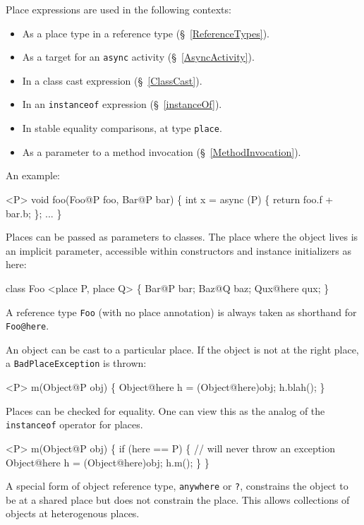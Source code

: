 Place expressions are used in the following contexts: 
\begin{itemize}
\item As a  place type in a reference type (\S~\ref{ReferenceTypes}).
\item As a target for an {\tt async} activity (\S~\ref{AsyncActivity}).
\item In a class cast expression  (\S~\ref{ClassCast}).
\item In an {\tt instanceof} expression (\S~\ref{instanceOf}).
\item In stable equality comparisons, at type {\tt place}.
\item As a parameter to a method invocation (\S~\ref{MethodInvocation}).
\end{itemize}

An example:
\begin{x10}
<P> void foo(Foo@P foo, Bar@P bar) \{
   int x = async (P) \{ return foo.f + bar.b; \};
   ...
\}
\end{x10}


Places can be passed as parameters to classes. The place where the
object lives is an implicit parameter, accessible within constructors
and instance initializers as here:

\begin{x10}
    class Foo <place P, place Q> \{
        Bar@P bar;
        Baz@Q baz;
        Qux@here qux;
    \}
\end{x10}

A reference type {\tt Foo} (with no place annotation) is always taken
as shorthand for {\tt Foo@here}.

An object can be cast to a particular place. If the object is not at
the right place, a {\tt BadPlaceException} is thrown:

\begin{x10}
    <P> m(Object@P obj) \{
        Object@here h = (Object@here)obj;
        h.blah();
    \}
\end{x10}

Places can be checked for equality. One can view this as the analog of
the {\tt instanceof} operator for places.

\begin{x10}
 <P> m(Object@P obj) \{
     if (here == P) \{
        // will never throw an exception
       Object@here h = (Object@here)obj;
       h.m();
   \}
\}
\end{x10}

A special form of object reference type, {\tt anywhere} or {\tt ?}, 
constrains the object to be at a shared place but does not constrain
the place. This allows collections of objects at heterogenous places.

